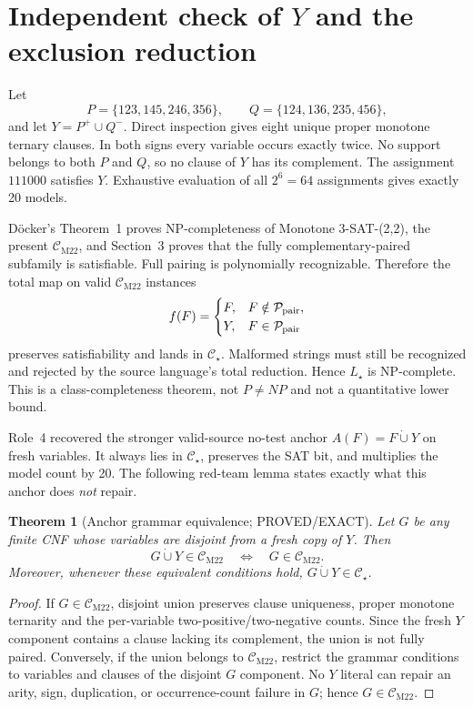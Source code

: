 \documentclass[11pt]{article}
\newtheorem{theorem}{Theorem}
\newcommand{\Cstar}{\mathcal C_\star}
\newcommand{\CM}{\mathcal C_{\mathrm{M22}}}
\begin{document}
\section{Independent check of $Y$ and the exclusion reduction}
Let
\[
 P=\{123,145,246,356\},\qquad Q=\{124,136,235,456\},
\]
and let $Y=P^+\cup Q^-$.  Direct inspection gives eight unique proper
monotone ternary clauses.  In both signs every variable occurs exactly twice.
No support belongs to both $P$ and $Q$, so no clause of $Y$ has its complement.
The assignment $111000$ satisfies $Y$.  Exhaustive evaluation of all
$2^6=64$ assignments gives exactly 20 models.

Döcker's Theorem~1 proves NP-completeness of Monotone 3-SAT-(2,2), the present
$\CM$, and Section~3 proves that the fully complementary-paired subfamily is
satisfiable.  Full pairing is polynomially recognizable.  Therefore the total
map on valid $\CM$ instances
\[
 f(F)=\begin{cases}F,&F\notin\mathcal P_{\rm pair},\\Y,&F\in\mathcal P_{\rm pair}
 \end{cases}
\]
preserves satisfiability and lands in $\Cstar$.  Malformed strings must still
be recognized and rejected by the source language's total reduction.  Hence
$L_\star$ is NP-complete.  This is a class-completeness theorem, not $P\ne NP$
and not a quantitative lower bound.

Role~4 recovered the stronger valid-source no-test anchor
$A(F)=F\mathbin{\dot\cup}Y$ on fresh variables.  It always lies in $\Cstar$,
preserves the SAT bit, and multiplies the model count by 20.  The following
red-team lemma states exactly what this anchor does \emph{not} repair.

\begin{theorem}[Anchor grammar equivalence; PROVED/EXACT]
Let $G$ be any finite CNF whose variables are disjoint from a fresh copy of
$Y$.  Then
\[
       G\mathbin{\dot\cup}Y\in\CM\quad\Longleftrightarrow\quad G\in\CM.
\]
Moreover, whenever these equivalent conditions hold,
$G\mathbin{\dot\cup}Y\in\Cstar$.
\end{theorem}
\begin{proof}
If $G\in\CM$, disjoint union preserves clause uniqueness, proper monotone
ternarity and the per-variable two-positive/two-negative counts.  Since the
fresh $Y$ component contains a clause lacking its complement, the union is not
fully paired.  Conversely, if the union belongs to $\CM$, restrict the grammar
conditions to variables and clauses of the disjoint $G$ component.  No $Y$
literal can repair an arity, sign, duplication, or occurrence-count failure in
$G$; hence $G\in\CM$.
\end{proof}
\end{document}
